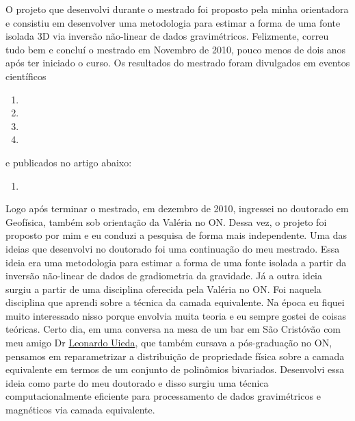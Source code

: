 \bigskip

\noindent O projeto que desenvolvi durante o mestrado foi proposto pela minha orientadora e consistiu
em desenvolver uma metodologia para estimar a forma de uma fonte isolada 3D via inversão
não-linear de dados gravimétricos. Felizmente, correu tudo bem e concluí o mestrado 
em Novembro de 2010, pouco menos de dois anos após ter iniciado o curso.
Os resultados do mestrado foram divulgados em eventos científicos
\begin{enumerate}
	\item {}
	\item {}
	\item {}
	\item {}
\end{enumerate}
\noindent e publicados no artigo abaixo:
\begin{enumerate}
	\item {} 
\end{enumerate}

\bigskip

\noindent Logo após terminar o mestrado, em dezembro de 2010, ingressei no doutorado em Geofísica,
também sob orientação da Valéria no ON. Dessa vez, o projeto foi proposto por mim
e eu conduzi a pesquisa de forma mais independente. Uma das ideias que desenvolvi no 
doutorado foi uma continuação do meu mestrado. Essa ideia era uma metodologia para
estimar a forma de uma fonte isolada a partir da inversão não-linear de dados de 
gradiometria da gravidade. Já a outra ideia surgiu a partir de uma disciplina oferecida
pela Valéria no ON. Foi naquela disciplina que aprendi sobre a técnica da camada 
equivalente. Na época eu fiquei muito interessado nisso porque envolvia muita teoria e eu
sempre gostei de coisas teóricas.
Certo dia, em uma conversa na mesa de um bar em São Cristóvão com meu amigo Dr
\href{https://www.leouieda.com/}{Leonardo Uieda}, que também cursava a pós-graduação no ON, pensamos em reparametrizar a
distribuição de propriedade física sobre a camada equivalente em termos de um conjunto de
polinômios bivariados. Desenvolvi essa ideia como parte do meu doutorado e disso 
surgiu uma técnica computacionalmente eficiente para processamento de dados gravimétricos
e magnéticos via camada equivalente.

\bigskip

